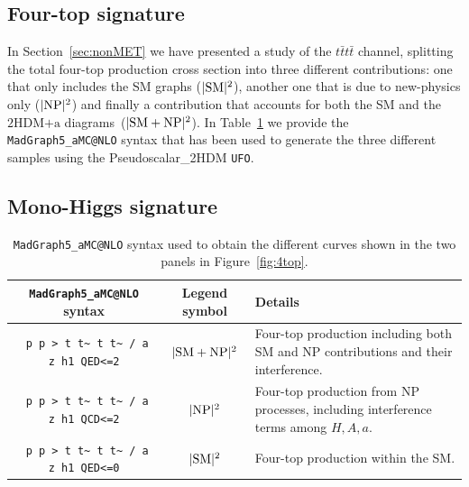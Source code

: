 \documentclass[a4paper, 11pt,notoc]{article}
\newcommand{\hdma}{\ensuremath{\textrm{2HDM+a}}\xspace}
\begin{document}
\subsection{Four-top signature}

In Section~\ref{sec:nonMET} we have presented a study of the $t \bar t t \bar t$ channel, splitting the  total four-top production cross section into three different contributions: one that only includes the SM graphs ($|{\rm SM}|^2$), another one that is due to new-physics only ($|{\rm NP}|^2$) and finally a contribution that accounts for both the SM and the \hdma diagrams~($|{\rm SM} + {\rm NP}|^2$). In Table~\ref{tab-dmhf-4tops} we provide the {\tt MadGraph5\_aMC@NLO} syntax that has been used to generate the three different samples using the Pseudoscalar\_2HDM {\tt UFO}. 

\subsection{Mono-Higgs signature}

\begin{table}[t!]
\begin{tabular}{ccm{50mm}}
\toprule
 {\tt MadGraph5\_aMC@NLO} syntax & Legend symbol & Details \\\midrule
\verb| p p > t t~ t t~ / a z h1 QED<=2|& $|{\rm SM}+{\rm NP}|^2$ & Four-top
production including both SM and NP contributions and their
interference. \\\midrule
\verb| p p > t t~ t t~ / a z h1 QCD<=2|& $|{\rm NP}|^2$ & Four-top
production from NP processes, including interference terms among
$H,A,a$. \\\midrule
\verb| p p > t t~ t t~ / a z h1 QED<=0|& $|{\rm SM}|^2$ & Four-top 
production within the SM.\\
\bottomrule
\end{tabular}
\vspace{4mm} 
\caption{{\tt MadGraph5\_aMC@NLO} syntax used to obtain the different curves shown in the two panels in Figure~\ref{fig:4top}.}
\label{tab-dmhf-4tops}
\end{table}
\end{document}

